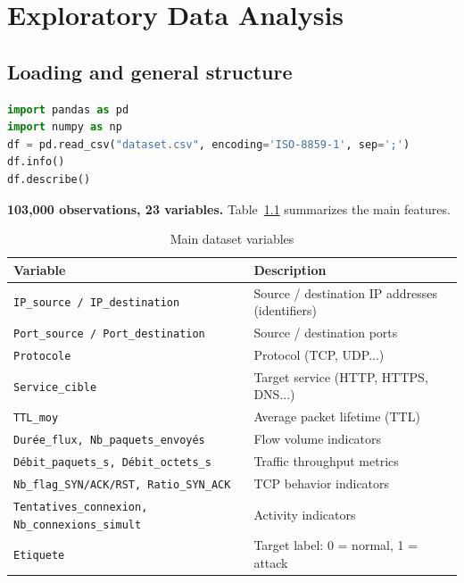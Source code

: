 \chapter{Exploratory Data Analysis}

\section{Loading and general structure}

\begin{lstlisting}[language=Python]
import pandas as pd
import numpy as np
df = pd.read_csv("dataset.csv", encoding='ISO-8859-1', sep=';')
df.info()
df.describe()
\end{lstlisting}

\textbf{103,000 observations, 23 variables.} Table~\ref{tab:variables} summarizes the main features.

\begin{table}[H]
\centering
\caption{Main dataset variables}
\label{tab:variables}
\small
\begin{tabular}{p{4.2cm}p{8.5cm}}
\toprule
\textbf{Variable} & \textbf{Description} \\
\midrule
\texttt{IP\_source / IP\_destination} & Source / destination IP addresses (identifiers) \\
\texttt{Port\_source / Port\_destination} & Source / destination ports \\
\texttt{Protocole} & Protocol (TCP, UDP...) \\
\texttt{Service\_cible} & Target service (HTTP, HTTPS, DNS...) \\
\texttt{TTL\_moy} & Average packet lifetime (TTL) \\
\texttt{Durée\_flux, Nb\_paquets\_envoyés} & Flow volume indicators \\
\texttt{Débit\_paquets\_s, Débit\_octets\_s} & Traffic throughput metrics \\
\texttt{Nb\_flag\_SYN/ACK/RST, Ratio\_SYN\_ACK} & TCP behavior indicators \\
\texttt{Tentatives\_connexion, Nb\_connexions\_simult} & Activity indicators \\
\texttt{Etiquete} & Target label: 0 = normal, 1 = attack \\
\bottomrule
\end{tabular}
\end{table}

